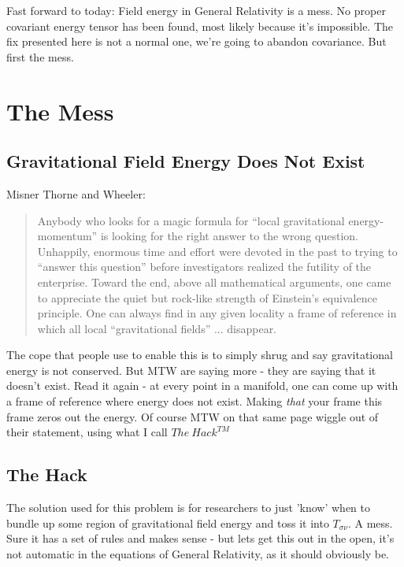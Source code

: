 \documentclass[../rzero]{subfiles}
\begin{document}
Fast forward to today: Field energy in General Relativity is a mess. No proper covariant energy tensor has been found, most likely because it's impossible. The fix presented here is not a normal one, we're going to abandon covariance. But first the mess.

\section{The Mess}
\subsection{Gravitational Field Energy Does Not Exist}
Misner Thorne and Wheeler\cite{Wheeler1973}:
   
   \begin{quotation}
   Anybody who looks for a magic formula for ``local gravitational energy-momentum'' is looking for the right answer to the wrong question. Unhappily, enormous time and effort were devoted in the past to trying to ``answer this question'' before investigators realized the futility of the enterprise. Toward the end, above all mathematical arguments, one came to appreciate the quiet but rock-like strength of Einstein's equivalence principle. One can always find in any given locality a frame  of reference in which all local ``gravitational fields'' ... disappear.
   \end{quotation}
   
 The cope that people use to enable this is to simply shrug and say gravitational energy is not conserved. But MTW are saying more - they are saying that it doesn't exist. Read it again - at every point in a manifold, one can come up with a frame of reference where energy does not exist. Making \textit{that} your frame this frame zeros out the energy. Of course MTW on that same page wiggle out of their statement, using what I call $The\ Hack^{TM}$
 
 \subsection{The Hack}
 The solution used for this problem is for researchers to just 'know' when to bundle up some region of gravitational field energy and toss it into $T_{\sigma \nu}$. A mess. Sure it has a set of rules and makes sense - but lets get this out in the open, it's not automatic in the equations of General Relativity, as it should obviously be.
 
\end{document}
